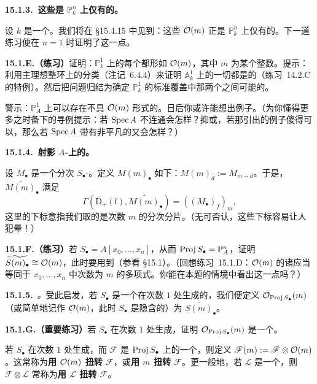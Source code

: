 \textbf{15.1.3.\ 这些是 $\mathbb{P}^n_k$ 上仅有的\trLineBundle。}

设 $k$ 是一个\trField。我们将在 \S15.4.15 中见到：这些 $\mathcal{O}(m)$ 正是 $\mathbb{P}^n_k$ 上仅有的\trInvertibleSheaf。下一道练习便在 $n=1$ 时证明了这一点。

\textbf{15.1.E.（练习）}\quad 证明：$\mathbb{P}^1_k$ 上的每个\trInvertibleSheaf{}都形如 $\mathcal{O}(m)$，其中 $m$ 为某个整数。提示：利用主理想整环上\trFinitelyGenerated{}\trModule{}的分类（\mbox{注记~6.4.4}）来证明 $\mathbb{A}^1_k$ 上的一切\trInvertibleSheaf{}都是\trTrivial{}的（\mbox{练习~14.2.C} 的特例）。然后把问题归结为确定 $\mathbb{P}^1_k$ 的标准覆盖中那两个\trOpenSubset{}之间可能的\trTransitionFunction。

警示：$\mathbb{P}^1_A$ 上可以存在不具 $\mathcal{O}(m)$ 形式的\trInvertibleSheaf。日后你或许能想出例子。（为你懂得更多之时备下的寻例提示：若 $\operatorname{Spec} A$ 不连通会怎样？抑或，若那引出的例子傻得可以，那么若 $\operatorname{Spec} A$ 带有非平凡的\trInvertibleSheaf{}又会怎样？）

\textbf{15.1.4.\ 射影 $A$-\trScheme{}上的\trLineBundle。}

设 $M_\bullet$ 是一个分次 $S_\bullet$-\trModule。定义\trGradedModule{} $M(m)_\bullet$ 如下：$M(m)_d:=M_{m+d}$。于是，\trQCSheaf{} $\widetilde{M(m)_\bullet}$ 满足
\[
\Gamma(\mathrm{D}_+(\mathrm{f}),\widetilde{M(m)_\bullet})=((M_\bullet)_f)_m,
\]
这里的下标意指我们取的是次数 $m$ 的分次分片。（无可否认，这些下标容易让人犯晕！）

\textbf{15.1.F.（练习）}\quad 若 $S_\bullet=A[x_0,\dots,x_n]$，从而 $\operatorname{Proj} S_\bullet=\mathbb{P}^n_A$，证明 $\widetilde{S(m)_\bullet}\cong\mathcal{O}(m)$，此时要用到\trTransitionFunction（参看 \S15.1）。（回想\mbox{练习~15.1.D}：$\mathcal{O}(m)$ 的诸\trGlobalSections{}应当等同于 $x_0,\dots,x_n$ 中次数为 $m$ 的\trHomogeneous{}多项式。你能在本题的情境中看出这一点吗？）

\textbf{15.1.5.}\ \emph{\trhDefinition{}。}\quad 受此启发，若 $S_\bullet$ 是一个在次数 $1$ 处生成的\trGradedRing，我们便定义 $\mathcal{O}_{\operatorname{Proj} S_\bullet}(m)$（或简单地记作 $\mathcal{O}(m)$，此时 $S_\bullet$ 是隐含的）为 $\widetilde{S(m)_\bullet}$。

\textbf{15.1.G.（重要练习）}\quad 若 $S_\bullet$ 在次数 $1$ 处生成，证明 $\mathcal{O}_{\operatorname{Proj} S_\bullet}(m)$ 是一个\trInvertibleSheaf。

若 $S_\bullet$ 在次数 $1$ 处生成，而 $\mathscr{F}$ 是 $\operatorname{Proj} S_\bullet$ 上的一个\trQCSheaf，则定义 $\mathscr{F}(m):=\mathscr{F}\otimes\mathcal{O}(m)$。这常称为\textbf{用 $\mathcal{O}(m)$ 扭转 $\mathscr{F}$}，或\textbf{用 $m$ 扭转 $\mathscr{F}$}。更一般地，若 $\mathscr{L}$ 是一个\trInvertibleSheaf，则 $\mathscr{F}\otimes\mathscr{L}$ 常称为\textbf{用 $\mathscr{L}$ 扭转 $\mathscr{F}$}。

